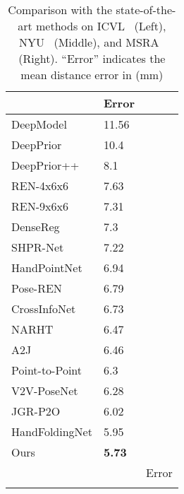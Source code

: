 \documentclass{article}
\begin{document}
\begin{table}
   \caption{Comparison with the state-of-the-art methods on ICVL~\cite{tang2014latent} (Left), NYU~\cite{tompson2014real} (Middle), and MSRA~\cite{sun2015cascaded} (Right). “Error” indicates the mean distance error in (mm)}
\begin{tabularx}{\columnwidth}{lll}
\resizebox{3cm}{!}{
    \begin{tabular}{cr}
\hline
                    Methods                    &   Error  \\
\hline
        DeepModel \cite{zhou2016model}         &        11.56 \\
      DeepPrior \cite{oberweger2015hands}      &        10.4  \\
  DeepPrior++ \cite{oberweger2017deepprior++}  &         8.1  \\
        REN-4x6x6 \cite{guo2017region}         &         7.63 \\
        REN-9x6x6 \cite{wang2018region}        &         7.31 \\
         DenseReg \cite{wan2018dense}          &         7.3  \\
         SHPR-Net \cite{chen2018shpr}          &         7.22 \\
        HandPointNet \cite{ge2018hand}         &         6.94 \\
         Pose-REN \cite{chen2020pose}          &         6.79 \\
    CrossInfoNet \cite{du2019crossinfonet}     &         6.73 \\
          NARHT \cite{huang2020hand}           &         6.47 \\
            A2J \cite{xiong2019a2j}            &         6.46 \\
       Point-to-Point \cite{ge2018point}       &         6.3  \\
        V2V-PoseNet \cite{moon2018v2v}         &         6.28 \\
          JGR-P2O \cite{fang2020jgr}           &         6.02 \\
 HandFoldingNet \cite{cheng2021handfoldingnet} &         5.95 \\
 Ours                                          &        \textbf{5.73} \\
\hline
\end{tabular}
}
&
\resizebox{3cm}{!}{
    \begin{tabular}{cr}
\hline
                       Methods                        &   Error  \\

\end{tabular}}
\end{tabularx}
\end{table}
\end{document}
